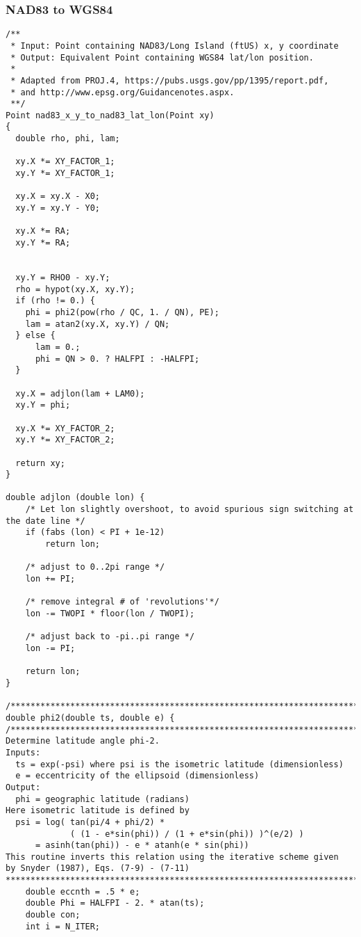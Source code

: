 \documentclass{article}
\begin{document}
\subsubsection{NAD83 to WGS84}
\begin{lstlisting}
/**
 * Input: Point containing NAD83/Long Island (ftUS) x, y coordinate
 * Output: Equivalent Point containing WGS84 lat/lon position.
 *
 * Adapted from PROJ.4, https://pubs.usgs.gov/pp/1395/report.pdf,
 * and http://www.epsg.org/Guidancenotes.aspx.
 **/
Point nad83_x_y_to_nad83_lat_lon(Point xy)
{
  double rho, phi, lam;

  xy.X *= XY_FACTOR_1;
  xy.Y *= XY_FACTOR_1;

  xy.X = xy.X - X0;
  xy.Y = xy.Y - Y0;

  xy.X *= RA;
  xy.Y *= RA;


  xy.Y = RHO0 - xy.Y;
  rho = hypot(xy.X, xy.Y);
  if (rho != 0.) {
    phi = phi2(pow(rho / QC, 1. / QN), PE);
    lam = atan2(xy.X, xy.Y) / QN;
  } else {
      lam = 0.;
      phi = QN > 0. ? HALFPI : -HALFPI;
  }

  xy.X = adjlon(lam + LAM0);
  xy.Y = phi;

  xy.X *= XY_FACTOR_2;
  xy.Y *= XY_FACTOR_2;

  return xy;
}

double adjlon (double lon) {
    /* Let lon slightly overshoot, to avoid spurious sign switching at the date line */
    if (fabs (lon) < PI + 1e-12)
        return lon;

    /* adjust to 0..2pi range */
    lon += PI;

    /* remove integral # of 'revolutions'*/
    lon -= TWOPI * floor(lon / TWOPI);

    /* adjust back to -pi..pi range */
    lon -= PI;

    return lon;
}

/*****************************************************************************/
double phi2(double ts, double e) {
/******************************************************************************
Determine latitude angle phi-2.
Inputs:
  ts = exp(-psi) where psi is the isometric latitude (dimensionless)
  e = eccentricity of the ellipsoid (dimensionless)
Output:
  phi = geographic latitude (radians)
Here isometric latitude is defined by
  psi = log( tan(pi/4 + phi/2) *
             ( (1 - e*sin(phi)) / (1 + e*sin(phi)) )^(e/2) )
      = asinh(tan(phi)) - e * atanh(e * sin(phi))
This routine inverts this relation using the iterative scheme given
by Snyder (1987), Eqs. (7-9) - (7-11)
*******************************************************************************/
    double eccnth = .5 * e;
    double Phi = HALFPI - 2. * atan(ts);
    double con;
    int i = N_ITER;


\end{lstlisting}
\end{document}
